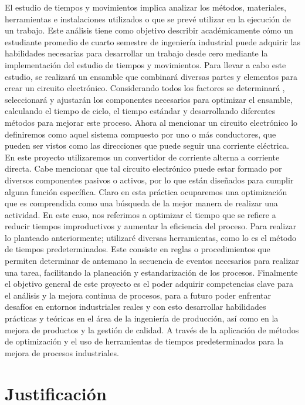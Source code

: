     El estudio de tiempos y movimientos implica analizar los métodos, materiales, herramientas e instalaciones utilizados o que se prevé utilizar en la ejecución de un trabajo. Este análisis tiene como objetivo describir académicamente cómo un estudiante promedio de cuarto semestre de ingeniería industrial puede adquirir las habilidades necesarias para desarrollar un trabajo desde cero mediante la implementación del estudio de tiempos y movimientos.\cite{carlos2016ingenieria}
    Para llevar a cabo este estudio, se realizará un ensamble que combinará diversas partes y elementos para crear un circuito electrónico. Considerando todos los factores se determinará , seleccionará y ajustarán los componentes necesarios para optimizar el ensamble, calculando el tiempo de ciclo, el tiempo estándar y desarrollando diferentes métodos para mejorar este proceso.
    Ahora al mencionar un circuito electrónico lo definiremos como aquel sistema compuesto por uno o más conductores, que pueden ser vistos como las direcciones que puede seguir una corriente eléctrica. En este proyecto utilizaremos un convertidor de corriente alterna a corriente directa. Cabe mencionar que tal circuito electrónico puede estar formado por diversos componentes pasivos o activos, por lo que están diseñados para cumplir alguna función específica.
    Claro en esta práctica ocuparemos una optimización que es comprendida como una búsqueda de la mejor manera de realizar una actividad. En este caso, nos referimos a optimizar el tiempo que se refiere a reducir tiempos improductivos y aumentar la eficiencia del proceso.
    Para realizar lo planteado anteriormente; utilizaré diversas herramientas, como lo es el método de tiempos predeterminados. Este consiste en reglas o procedimientos que permiten determinar de antemano la secuencia de eventos necesarios para realizar una tarea, facilitando la planeación y estandarización de los procesos. 
    Finalmente el objetivo general de este proyecto es el poder  adquirir competencias clave para el análisis y la mejora continua de procesos, para a futuro poder  enfrentar desafíos en entornos industriales reales y con esto desarrollar habilidades prácticas y teóricas en el área de la ingeniería de producción, así como en la mejora de productos y la gestión de calidad. A través de la aplicación de métodos de optimización y el uso de herramientas de tiempos predeterminados para la mejora de procesos industriales.
    \section{Justificación}
    
